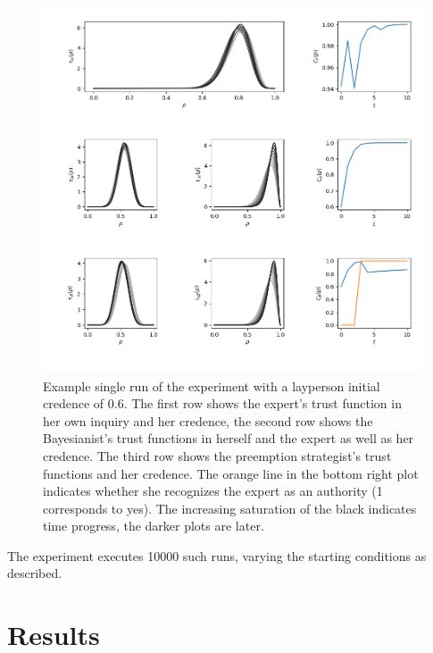 \documentclass[11pt, a4paper]{article}
\begin{document}
\begin{figure}
	\centering
\includegraphics[width=\textwidth]{Run.png}
\caption{Example single run of the experiment with a layperson initial credence of $0.6$. The first row shows the expert's trust function in her own inquiry and her credence, the second row shows the Bayesianist's trust functions in herself and the expert as well as her credence. The third row shows the preemption strategist's trust functions and her credence. The orange line in the bottom right plot indicates whether she recognizes the expert as an authority (1 corresponds to yes). The increasing saturation of the black indicates time progress, the darker plots are later.\label{fig:run}}
\end{figure}

The experiment executes 10000 such runs, varying the starting conditions as described.

\section{Results}
\end{document}

